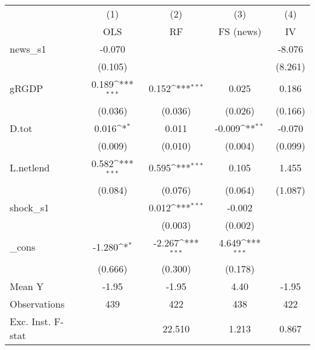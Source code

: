 {
\def\sym#1{\ifmmode^{#1}\else\(^{#1}\)\fi}
\begin{tabular}{l*{4}{c}}
\toprule
            &\multicolumn{1}{c}{(1)}&\multicolumn{1}{c}{(2)}&\multicolumn{1}{c}{(3)}&\multicolumn{1}{c}{(4)}\\
            &\multicolumn{1}{c}{OLS}&\multicolumn{1}{c}{RF}&\multicolumn{1}{c}{FS (news)}&\multicolumn{1}{c}{IV}\\
\midrule
news\_s1     &      -0.070         &                     &                     &      -8.076         \\
            &     (0.105)         &                     &                     &     (8.261)         \\
\addlinespace
gRGDP       &       0.189\sym{***}&       0.152\sym{***}&       0.025         &       0.186         \\
            &     (0.036)         &     (0.036)         &     (0.026)         &     (0.166)         \\
\addlinespace
D.tot       &       0.016\sym{*}  &       0.011         &      -0.009\sym{**} &      -0.070         \\
            &     (0.009)         &     (0.010)         &     (0.004)         &     (0.099)         \\
\addlinespace
L.netlend   &       0.582\sym{***}&       0.595\sym{***}&       0.105         &       1.455         \\
            &     (0.084)         &     (0.076)         &     (0.064)         &     (1.087)         \\
\addlinespace
shock\_s1    &                     &       0.012\sym{***}&      -0.002         &                     \\
            &                     &     (0.003)         &     (0.002)         &                     \\
\addlinespace
\_cons      &      -1.280\sym{*}  &      -2.267\sym{***}&       4.649\sym{***}&                     \\
            &     (0.666)         &     (0.300)         &     (0.178)         &                     \\
\midrule
Mean Y      &       -1.95         &       -1.95         &        4.40         &       -1.95         \\
Observations&         439         &         422         &         438         &         422         \\
Exc. Inst. F-stat&                     &      22.510         &       1.213         &       0.867         \\
\bottomrule
\end{tabular}
}
